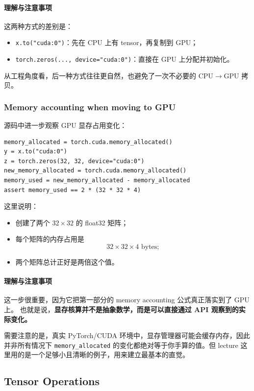 \documentclass[a4paper,UTF8]{article}
\numberwithin{equation}{section}
\begin{document}
\paragraph{理解与注意事项}
这两种方式的差别是：
\begin{itemize}
    \item \verb|x.to("cuda:0")|：先在 CPU 上有 tensor，再复制到 GPU；
    \item \verb|torch.zeros(..., device="cuda:0")|：直接在 GPU 上分配并初始化。
\end{itemize}

从工程角度看，后一种方式往往更自然，也避免了一次不必要的 CPU$\to$GPU 拷贝。

\subsubsection{Memory accounting when moving to GPU}

源码中进一步观察 GPU 显存占用变化：
\begin{verbatim}
memory_allocated = torch.cuda.memory_allocated()
y = x.to("cuda:0")
z = torch.zeros(32, 32, device="cuda:0")
new_memory_allocated = torch.cuda.memory_allocated()
memory_used = new_memory_allocated - memory_allocated
assert memory_used == 2 * (32 * 32 * 4)
\end{verbatim}

这里说明：
\begin{itemize}
    \item 创建了两个 \(32 \times 32\) 的 float32 矩阵；
    \item 每个矩阵的内存占用是
    \[
    32 \times 32 \times 4 \text{ bytes};
    \]
    \item 两个矩阵总计正好是两倍这个值。
\end{itemize}

\paragraph{理解与注意事项}
这一步很重要，因为它把第一部分的 memory accounting 公式真正落实到了 GPU 上。  
也就是说，\textbf{显存核算并不是抽象数学，而是可以直接通过 API 观察到的实际变化。}

需要注意的是，真实 PyTorch/CUDA 环境中，显存管理器可能会缓存内存，因此并非所有情况下 \verb|memory_allocated| 的变化都绝对等于你手算的值。但 lecture 这里用的是一个足够小且清晰的例子，用来建立最基本的直觉。

\subsection{Tensor Operations}
\end{document}
